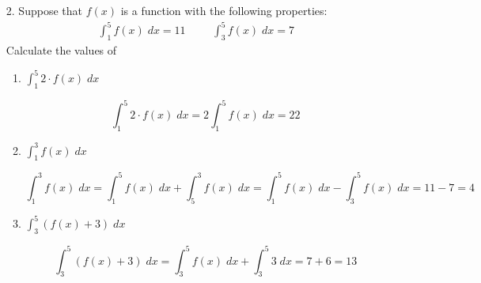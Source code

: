 \documentclass[11pt]{article}
\begin{document}
\newsavebox{\quizback}
\begin{lrbox}{\quizback}
\begin{minipage}[top][5.5in][t]{\textwidth} \setlength{\parindent}{1.5em}
\begin{enumerate}
\item[2.] Suppose that $f(x)$ is a function with the following properties:
  \begin{align*}
    \int_1^5 f(x)\;dx = 11 &&& \int_3^5 f(x)\;dx = 7
  \end{align*}
  Calculate the values of
  \begin{enumerate}
  \item $\displaystyle \int_1^5 2\cdot f(x)\;dx$
    \vfill
    {\color{blue}

      \[
      \int_1^5 2\cdot f(x)\;dx = 2\int_1^5 f(x)\;dx = 22
      \]

    }
    \vfill
  \item $\displaystyle \int_1^3 f(x)\;dx$
    \vfill
    {\color{blue}

      \[
      \int_1^3 f(x)\;dx = \int_1^5 f(x)\;dx + \int_5^3 f(x)\;dx
      = \int_1^5 f(x)\;dx - \int_3^5 f(x)\;dx = 11 - 7 = 4
      \]

    }
    \vfill
  \item $\displaystyle \int_3^5 (f(x) + 3)\;dx$
    \vfill
    {\color{blue}

      \[
      \int_3^5 (f(x) + 3)\;dx = \int_3^5 f(x)\; dx + \int_3^5 3\; dx = 7 + 6 = 13
      \]

    }
    \vfill
  \end{enumerate}

\end{enumerate}
\end{minipage}
\end{lrbox}

\noindent \usebox{\quizfront}
\vfill
\noindent \usebox{\quizback}

\end{document}
